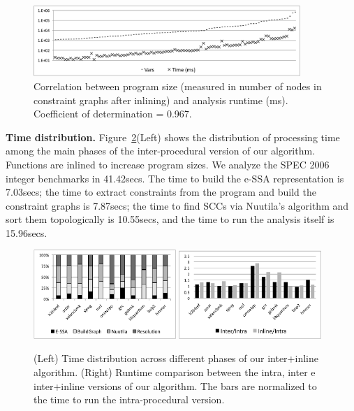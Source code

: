 \documentclass{llncs}
\begin{document}
\begin{figure}[t!]
\begin{center}
\includegraphics[width=0.9\textwidth]{images/TimeCorr}
\end{center}
\caption{\label{fig:TimeCorr}
Correlation between program size (measured in number of nodes in constraint
graphs after inlining) and analysis runtime (ms).
Coefficient of determination = 0.967.
}
\end{figure}

\noindent
\textbf{Time distribution.}
Figure~\ref{fig:timeComp}(Left) shows the distribution of processing time
among the main phases of the inter-procedural version of our algorithm.
Functions are inlined to increase program sizes.
We analyze the SPEC 2006 integer benchmarks in 41.42secs.
The time to build the e-SSA representation is 7.03secs; the time to extract
constraints from the program and build the constraint graphs is 7.87secs;
the time to find SCCs via Nuutila's algorithm and sort them topologically is
10.55secs, and the time to run the analysis itself is 15.96secs.

\begin{figure}[t!]
\begin{center}
\includegraphics[width=0.48\textwidth]{images/timeDistr}
\includegraphics[width=0.48\textwidth]{images/timeIntraInterInline}
\end{center}
\caption{\label{fig:timeComp}
(Left) Time distribution across different phases of our inter+inline
algorithm.
(Right) Runtime comparison between the intra, inter e inter+inline versions of
our algorithm.
The bars are normalized to the time to run the intra-procedural version.
}
\end{figure}
\end{document}
